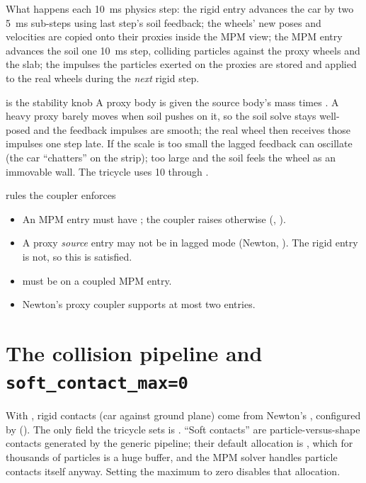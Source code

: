What happens each 10~ms physics step: the rigid entry advances the car by two
5~ms sub-steps using last step's soil feedback; the wheels' new poses and
velocities are copied onto their proxies inside the MPM view; the MPM entry
advances the soil one 10~ms step, colliding particles against the proxy
wheels and the slab; the impulses the particles exerted on the proxies are
stored and applied to the real wheels during the \emph{next} rigid step.

\begin{whybox}{ is the stability knob}
A proxy body is given the source body's mass times . A
heavy proxy barely moves when soil pushes on it, so the soil solve stays
well-posed and the feedback impulses are smooth; the real wheel then receives
those impulses one step late. If the scale is too small the lagged feedback
can oscillate (the car ``chatters'' on the strip); too large and the soil
feels the wheel as an immovable wall. The tricycle uses 10 through
.
\end{whybox}

\begin{warnbox}{rules the coupler enforces}
\begin{itemize}[leftmargin=1.4em,nosep]
  \item An MPM entry must have ; the coupler raises
         otherwise (, ).
  \item A proxy \emph{source} entry may not be  in lagged mode
        (Newton, ). The rigid entry is not, so
        this is satisfied.
  \item {} must be  on a coupled
        MPM entry.
  \item Newton's proxy coupler supports at most two entries.
\end{itemize}
\end{warnbox}

\section{The collision pipeline and \texttt{soft\_contact\_max=0}}

With , rigid contacts (car against ground
plane) come from Newton's , configured by
 ().
The only field the tricycle sets is . ``Soft
contacts'' are particle-versus-shape contacts generated by the generic
pipeline; their default allocation is ,
which for thousands of particles is a huge buffer, and the MPM solver handles
particle contacts itself anyway. Setting the maximum to zero disables that
allocation.

